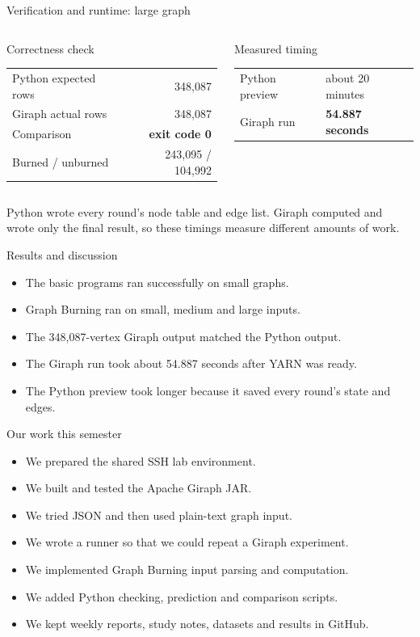\documentclass[aspectratio=169]{beamer}
\begin{document}
\begin{frame}{Verification and runtime: large graph}
\scriptsize
\begin{columns}[T]
\begin{block}{Correctness check}
\begin{tabular}{lr}
Python expected rows & 348,087 \\
Giraph actual rows & 348,087 \\
Comparison & \textbf{exit code 0} \\
Burned / unburned & 243,095 / 104,992
\end{tabular}
\end{block}

\begin{alertblock}{Measured timing}
\begin{tabular}{ll}
Python preview & about 20 minutes \\
Giraph run & \textbf{54.887 seconds}
\end{tabular}
\end{alertblock}
\end{columns}

\vspace{0.25cm}
\small Python wrote every round's node table and edge list. Giraph computed and wrote only the final result, so these timings measure different amounts of work.
\end{frame}

\begin{frame}{Results and discussion}
\begin{itemize}
  \item The basic programs ran successfully on small graphs.
  \item Graph Burning ran on small, medium and large inputs.
  \item The 348,087-vertex Giraph output matched the Python output.
  \item The Giraph run took about 54.887 seconds after YARN was ready.
  \item The Python preview took longer because it saved every round's state and edges.
\end{itemize}
\end{frame}

\begin{frame}{Our work this semester}
\begin{itemize}
  \item We prepared the shared SSH lab environment.
  \item We built and tested the Apache Giraph JAR.
  \item We tried JSON and then used plain-text graph input.
  \item We wrote a runner so that we could repeat a Giraph experiment.
  \item We implemented Graph Burning input parsing and computation.
  \item We added Python checking, prediction and comparison scripts.
  \item We kept weekly reports, study notes, datasets and results in GitHub.
\end{itemize}
\end{frame}
\end{document}
